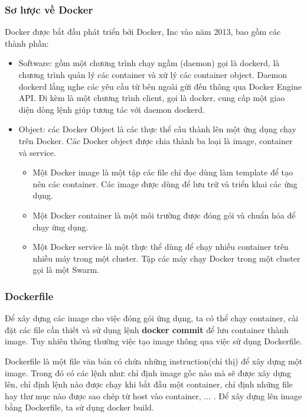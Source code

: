 \subsubsection{Sơ lược về Docker}
Docker được bắt đầu phát triển bởi Docker, Inc vào năm 2013,
bao gồm các thành phần:
\begin{itemize}[topsep=0ex]
\item Software: gồm một chương trình chạy ngầm (daemon) gọi là dockerd,
    là chương trình quản lý các container và xử lý các container object.
    Daemon dockerd lắng nghe các yêu cầu từ bên ngoài gửi đến thông qua
    Docker Engine API. Đi kèm là một chương trình client, gọi là docker,
    cung cấp một giao diện dòng lệnh giúp tương tác với daemon dockerd.

\item Object: các Docker Object là các thực thể cấu thành lên một
    ứng dụng chạy trên Docker. Các Docker object được chia thành ba
    loại là image, container và service.
    \begin{itemize}
    \item Một Docker image là một tập các file chỉ đọc dùng làm
        template để tạo nên các container. Các image được dùng để
        lưu trữ và triển khai các ứng dụng.

    \item Một Docker container là một môi trường được đóng gói
        và chuẩn hóa để chạy ứng dụng.

    \item Một Docker service là một thực thể dùng để chạy nhiều
        container trên nhiều máy trong một cluster. Tập các máy chạy
        Docker trong một cluster gọi là một Swarm.  
    \end{itemize}
\end{itemize}

\subsubsection{Dockerfile}
Để xây dựng các image cho việc đóng gói ứng dụng, ta có thể
chạy container, cài đặt các file cần thiết và sử dụng lệnh
\textbf{docker commit} để lưu container thành image. Tuy nhiên thông thường
việc tạo image thông qua việc sử dụng Dockerfile.

Dockerfile là một file văn bản có chứa những instruction(chỉ thị) để xây
dựng một image. Trong đó có các lệnh như: chỉ định image gốc nào mà
sẽ được xây dựng lên, chỉ định lệnh nào được chạy khi bắt đầu
một container, chỉ định những file hay thư mục nào được sao
chép từ host vào container, ...
. Để xây dựng lên image bằng Dockerfile, ta sử dụng docker build.

